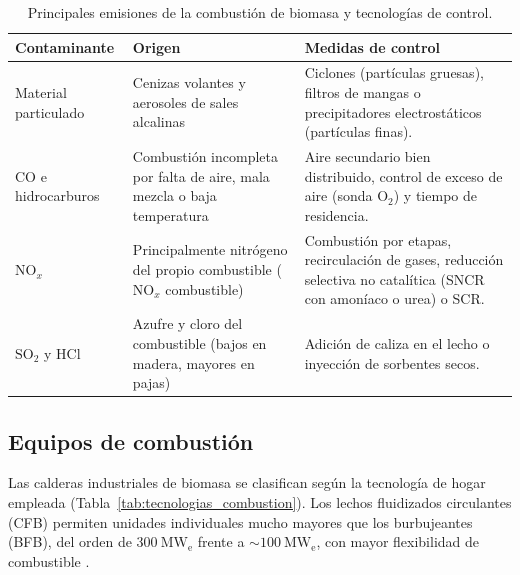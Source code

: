 \begin{table}[htbp]
\centering
\caption{Principales emisiones de la combustión de biomasa y tecnologías de control.}
\label{tab:emisiones_combustion}
\begin{tabularx}{\textwidth}{@{}l X X@{}}
\toprule
\textbf{Contaminante} & \textbf{Origen} & \textbf{Medidas de control} \\
\midrule
Material particulado & Cenizas volantes y aerosoles de sales alcalinas & Ciclones (partículas gruesas), filtros de mangas o precipitadores electrostáticos (partículas finas). \\
$\mathrm{CO}$ e hidrocarburos & Combustión incompleta por falta de aire, mala mezcla o baja temperatura & Aire secundario bien distribuido, control de exceso de aire (sonda $\mathrm{O_2}$) y tiempo de residencia. \\
$\mathrm{NO}_x$ & Principalmente nitrógeno del propio combustible ($\mathrm{NO}_x$ combustible) & Combustión por etapas, recirculación de gases, reducción selectiva no catalítica (SNCR con amoníaco o urea) o SCR. \\
$\mathrm{SO_2}$ y $\mathrm{HCl}$ & Azufre y cloro del combustible (bajos en madera, mayores en pajas) & Adición de caliza en el lecho o inyección de sorbentes secos. \\
\bottomrule
\end{tabularx}
\end{table}

\subsection{Equipos de combustión}
Las calderas industriales de biomasa se clasifican según la tecnología de hogar empleada (Tabla~\ref{tab:tecnologias_combustion}). Los lechos fluidizados circulantes (CFB) permiten unidades individuales mucho mayores que los burbujeantes (BFB), del orden de $300~\mathrm{MW_e}$ frente a $\sim 100~\mathrm{MW_e}$, con mayor flexibilidad de combustible \cite{flynn2005alholmens, irena2015heatpower}.

